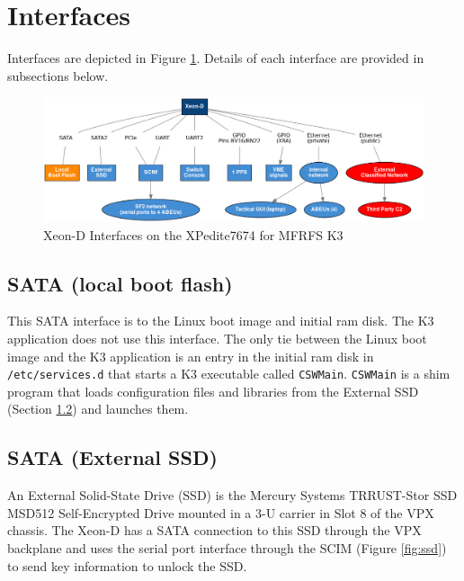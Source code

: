 \documentclass[12pt]{article}
\begin{document}
\section{Interfaces}

Interfaces are depicted in Figure \ref{fig:inteface}.  Details of each
interface are provided in subsections below.

\begin{figure}[H]
\begin{center}
\includegraphics[width=1.0\textwidth]{img/interface}
\caption{Xeon-D Interfaces on the XPedite7674 for MFRFS K3}
\label{fig:inteface}
\end{center}
\end{figure}



\subsection{SATA (local boot flash)}
\label{section:sata}

This SATA interface is to the Linux boot image and initial ram disk.
The K3 application does not use this interface.
The only tie between the Linux boot image and the K3 application is 
an entry in the initial ram disk in \texttt{/etc/services.d} that
starts a K3 executable called \texttt{CSWMain}.
\texttt{CSWMain} is a shim program that loads configuration files
and libraries from the External SSD (Section \ref{section:sata2}) and
launches them.



\subsection{SATA (External SSD)}
\label{section:sata2}

An External Solid-State Drive (SSD) is the Mercury Systems TRRUST-Stor SSD MSD512 Self-Encrypted Drive mounted in a 3-U carrier in Slot 8 of the VPX chassis.  The Xeon-D has a SATA connection to this SSD through the VPX backplane and uses the serial port interface through the SCIM (Figure \ref{fig:ssd}) to send key information to unlock the SSD. 
\vspace{0.8cm}
\end{document}
